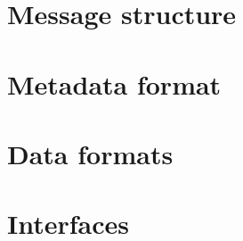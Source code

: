 \documentclass[a4paper,twoside]{article}
\begin{document}
\section{Message structure}

\section{Metadata format}

\section{Data formats}

\section{Interfaces}

\printbibliography
\end{document}
